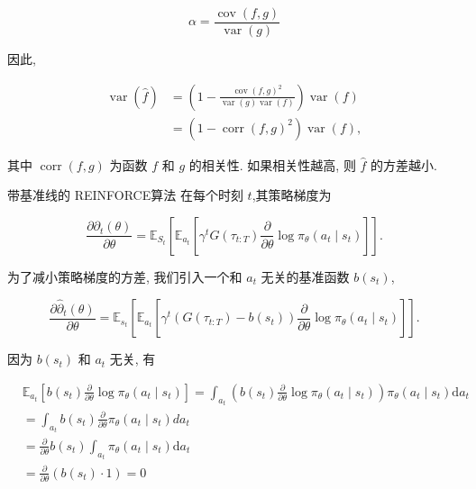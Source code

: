 \documentclass[10pt]{article}
\begin{document}
\begin{equation*}
\alpha=\frac{\operatorname{cov}(f, g)}{\operatorname{var}(g)} \tag{14.59}
\end{equation*}


因此,


\begin{align*}
\operatorname{var}(\hat{f}) & =\left(1-\frac{\operatorname{cov}(f, g)^{2}}{\operatorname{var}(g) \operatorname{var}(f)}\right) \operatorname{var}(f)  \tag{14.60}\\
& =\left(1-\operatorname{corr}(f, g)^{2}\right) \operatorname{var}(f), \tag{14.61}
\end{align*}


其中 $\operatorname{corr}(f, g)$ 为函数 $f$ 和 $g$ 的相关性. 如果相关性越高, 则 $\hat{f}$ 的方差越小.

带基准线的 REINFORCE算法 在每个时刻 $t$,其策略梯度为


\begin{equation*}
\frac{\partial \mathcal{\partial}_{t}(\theta)}{\partial \theta}=\mathbb{E}_{S_{t}}\left[\mathbb{E}_{a_{t}}\left[\gamma^{t} G\left(\tau_{t: T}\right) \frac{\partial}{\partial \theta} \log \pi_{\theta}\left(a_{t} \mid s_{t}\right)\right]\right] . \tag{14.62}
\end{equation*}


为了减小策略梯度的方差, 我们引入一个和 $a_{t}$ 无关的基准函数 $b\left(s_{t}\right)$,


\begin{equation*}
\frac{\partial \hat{\partial}_{t}(\theta)}{\partial \theta}=\mathbb{E}_{s_{t}}\left[\mathbb{E}_{a_{t}}\left[\gamma^{t}\left(G\left(\tau_{t: T}\right)-b\left(s_{t}\right)\right) \frac{\partial}{\partial \theta} \log \pi_{\theta}\left(a_{t} \mid s_{t}\right)\right]\right] . \tag{14.63}
\end{equation*}


因为 $b\left(s_{t}\right)$ 和 $a_{t}$ 无关, 有

$$
\begin{aligned}
& \mathbb{E}_{a_{t}}\left[b\left(s_{t}\right) \frac{\partial}{\partial \theta} \log \pi_{\theta}\left(a_{t} \mid s_{t}\right)\right]=\int_{a_{t}}\left(b\left(s_{t}\right) \frac{\partial}{\partial \theta} \log \pi_{\theta}\left(a_{t} \mid s_{t}\right)\right) \pi_{\theta}\left(a_{t} \mid s_{t}\right) \mathrm{d} a_{t} \\
& =\int_{a_{t}} b\left(s_{t}\right) \frac{\partial}{\partial \theta} \pi_{\theta}\left(a_{t} \mid s_{t}\right) d a_{t} \\
& =\frac{\partial}{\partial \theta} b\left(s_{t}\right) \int_{a_{t}} \pi_{\theta}\left(a_{t} \mid s_{t}\right) \mathrm{d} a_{t} \\
& =\frac{\partial}{\partial \theta}\left(b\left(s_{t}\right) \cdot 1\right)=0
\end{aligned}
$$
\end{document}
